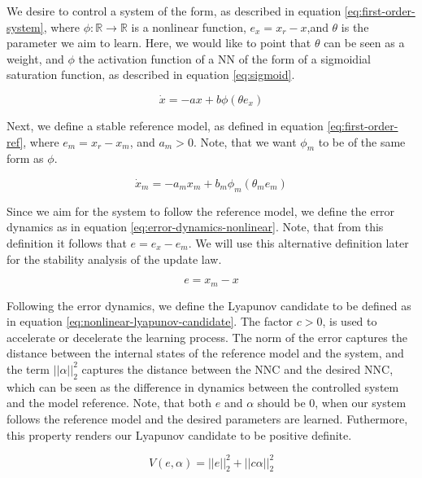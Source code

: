 We desire to control a system of the form, as described in equation \eqref{eq:first-order-system}, where $\phi: \mathbb{R}\rightarrow\mathbb{R}$ is a nonlinear function, $e_x=x_r - x$,and $\theta$ is the parameter we aim to learn. Here, we would like to point that $\theta$ can be seen as a weight, and $\phi$ the activation function of a NN of the form of a sigmoidial saturation function, as described in equation \eqref{eq:sigmoid}.

\begin{equation}
    \dot x = -ax + b\phi(\theta e_x)
    \label{eq:first-order-system}
\end{equation}

Next, we define a stable reference model, as defined in equation \eqref{eq:first-order-ref}, where $e_m=x_r - x_m$, and $a_m>0$. Note, that we want $\phi_m$ to be of the same form as $\phi$.

\begin{equation}
    \dot x_m = -a_mx_m + b_m\phi_m(\theta_m e_m)
    \label{eq:first-order-ref}
\end{equation}

Since we aim for the system to follow the reference model, we define the error dynamics as in equation \eqref{eq:error-dynamics-nonlinear}. Note, that from this definition it follows that $e=e_x-e_m$. We will use this alternative definition later for the stability analysis of the update law.

\begin{equation}
    e=x_m-x
    \label{eq:error-dynamics-nonlinear}
\end{equation}

Following the error dynamics, we define the Lyapunov candidate to be defined as in equation \eqref{eq:nonlinear-lyapunov-candidate}. The factor $c>0$, is used to accelerate or decelerate the learning process. The norm of the error captures the distance between the internal states of the reference model and the system, and the term $||\alpha||_2^2$ captures the distance between the NNC and the desired NNC, which can be seen as the difference in dynamics between the controlled system and the model reference. Note, that both $e$ and $\alpha$ should be $0$, when our system follows the reference model and the desired parameters are learned. Futhermore, this property renders our Lyapunov candidate to be positive definite.

\begin{equation}
    V(e, \alpha) =||e||_2^2 + ||c \alpha||_2^2
    \label{eq:nonlinear-lyapunov-candidate}
\end{equation}

